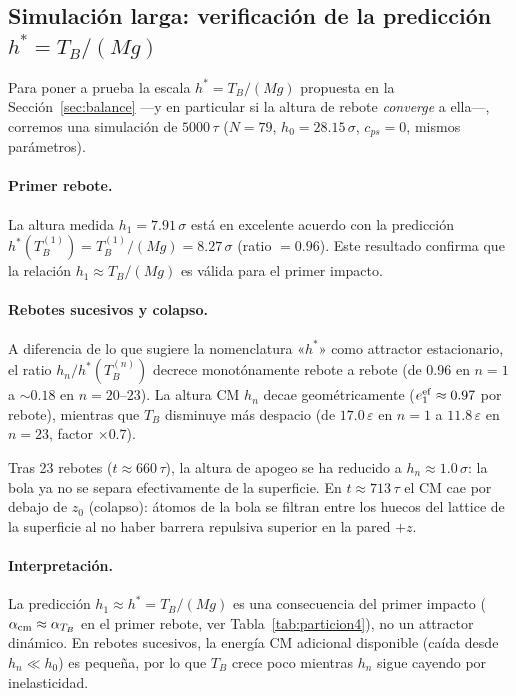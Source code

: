 \documentclass[12pt,a4paper]{article}
\newcommand{\eps}{\varepsilon}
\begin{document}
\subsection{Simulación larga: verificación de la predicción \texorpdfstring{$h^*=T_B/(Mg)$}{h*}}
\label{sec:largo}

Para poner a prueba la escala $h^*=T_B/(Mg)$ propuesta en la
Sección~\ref{sec:balance} ---y en particular si la altura de rebote
\emph{converge} a ella---, corremos una simulación de $5000\,\tau$
($N=79$, $h_0=28.15\,\sigma$, $c_{ps}=0$, mismos parámetros).

\paragraph{Primer rebote.}
La altura medida $h_1=7.91\,\sigma$ está en excelente acuerdo con la predicción
$h^*(T_B^{(1)})=T_B^{(1)}/(Mg)=8.27\,\sigma$ (ratio $=0.96$).
Este resultado confirma que la relación $h_1\approx T_B/(Mg)$ es válida para
el primer impacto.

\paragraph{Rebotes sucesivos y colapso.}
A diferencia de lo que sugiere la nomenclatura «$h^*$» como attractor
estacionario, el ratio $h_n/h^*(T_B^{(n)})$ decrece monotónamente rebote a
rebote (de 0.96 en $n=1$ a $\sim0.18$ en $n=20$--$23$).
La altura CM $h_n$ decae geométricamente ($e_1^{\rm ef}\approx0.97$ por rebote),
mientras que $T_B$ disminuye más despacio (de $17.0\,\eps$ en $n=1$ a
$11.8\,\eps$ en $n=23$, factor $\times0.7$).

Tras 23 rebotes ($t\approx660\,\tau$), la altura de apogeo se ha reducido a
$h_n\approx1.0\,\sigma$: la bola ya no se separa efectivamente de la
superficie. En $t\approx713\,\tau$ el CM cae por debajo de $z_0$
(colapso): átomos de la bola se filtran entre los huecos del lattice de
la superficie al no haber barrera repulsiva superior en la pared $+z$.

\paragraph{Interpretación.}
La predicción $h_1\approx h^*=T_B/(Mg)$ es una consecuencia del primer impacto
($\alpha_{\rm cm}\approx\alpha_{T_B}$ en el primer rebote, ver
Tabla~\ref{tab:particion4}), no un attractor dinámico. En rebotes sucesivos,
la energía CM adicional disponible (caída desde $h_n\ll h_0$) es pequeña,
por lo que $T_B$ crece poco mientras $h_n$ sigue cayendo por inelasticidad.
\end{document}
